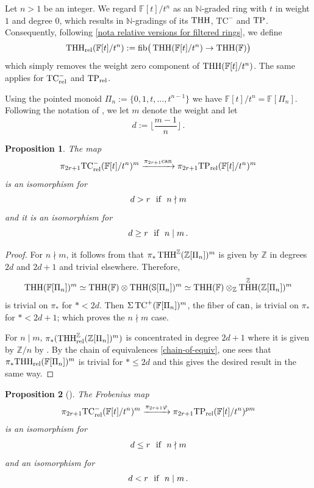 \documentclass[english,10pt]{amsart}
\newcommand{\sph}{\mathbb{S}}
\newcommand{\rel}{\textup{rel}}
\newcommand{\field}{\mathbb{F}}
\newtheorem{prop}{Proposition}[section]
\theoremstyle{definition}
\numberwithin{equation}{section}
\newcommand{\ntc}{\mathrm{TC}^{-}}
\DeclareMathOperator{\tp}{\ensuremath{\textup{TP}}}
\DeclareMathOperator{\tc}{\ensuremath{\textup{TC}}}
\DeclareMathOperator{\thh}{\ensuremath{\textup{THH}}}
\newcommand{\rntc}{\mathrm{TC}_{\rel}^{-}}
\newcommand{\rtp}{\mathrm{TP}_{\rel}}
\newcommand{\rthh}{\mathrm{THH}_{\rel}}
\newcommand{\z}{\mathbb{Z}}
\newcommand{\N}{\mathbb{N}}
\newcommand{\pis}{\pi_*}
\begin{document}
Let $n>1$ be an integer. We regard $\field[t]/t^n$ as an $\mathbb{N}$-graded ring with $t$ in weight $1$ and degree $0$, which results in  $\N$-gradings of its $\thh$, $\ntc$ and $\tp$. Consequently, following  \autoref{nota relative versions for filtered rings}, we define
\[\rthh(\field[t]/t^n):= \textup{fib} \big(\thh(\field[t]/t^n)\to \thh(\field)\big)\] 
which simply removes the weight zero component of $\thh(\field[t]/t^n)$. The same applies for $\rntc$ and $\rtp$. 

Using the pointed monoid $\Pi_n:= \{0,1,t,...,t^{n-1}\}$ we have $\field[t]/t^n  = \field[\Pi_n]$.  Following the notation of \cite{speirs2020truncatedpolynomial}, we let $m$ denote the weight and let 
\[d:= \Big\lfloor{\frac{m-1}{n}\Big\rfloor}\,. \]

\begin{prop}\label{prop speirs can iso}
The map 
\[\pi_{2r+1} \rntc(\field[t]/t^n)^m \xrightarrow{\pi_{2r+1} \textup{can}} \pi_{2r+1} \rtp(\field[t]/t^n)^m\]
is an isomorphism for 
\[d>r \textup{\ \ if \  } n \nmid m\]
and it is an isomorphism for 
\[d \geq r  \textup{\ \ if  \ } n \mid m\,.\]
\end{prop}
\begin{proof}
For $n\nmid m$, it follows from \cite[Lemma 4]{speirs2020truncatedpolynomial} that $\pis \thh^\z(\z[\Pi_n])^m$ is given by $\z$ in degrees $2d$ and $2d+1$ and trivial elsewhere. Therefore, 
\begin{equation}\label{chain-of-equiv}
\thh(\field[\Pi_n])^m \simeq \thh(\field) \otimes \thh(\sph[\Pi_n])^m \simeq \thh(
\field) \otimes_{\z}\thh^\z(\z[\Pi_n])^m
\end{equation}
is trivial on $\pis$ for $*<2d$. Then  $\Sigma \tc^+(\field[\Pi_n])^m$, the fiber of $\textup{can}$, is trivial on $\pis $ for $*<2d+1$; which proves the $n \nmid m$ case. 

For $n \mid m$, $\pi_*(\rthh^\z(\z[\Pi_n])^m)$ is concentrated in degree $2d+1$ where it is given by $\z/n$ by \cite[Lemma 4]{speirs2020truncatedpolynomial}. By the chain of equivalences \eqref{chain-of-equiv}, one sees that $\pis \rthh(\field[\Pi_n])^m$ is trivial for $*\leq 2d$ and this gives the desired result in the same way.
\end{proof}


\begin{prop}[{\cite[Corollary 9]{speirs2020truncatedpolynomial}}]\label{prop speirs frobenius iso}
The Frobenius map 
\[\pi_{2r+1} \rntc(\field[t]/t^n)^m \xrightarrow{\pi_{2r+1} \varphi} \pi_{2r+1} \rtp(\field[t]/t^n)^{pm}\]
is an isomorphism for 
\[d \leq r \textup{\ \ if  \ } n \nmid m\]
and an isomorphism for 
\[d < r \textup{\ \ if \  } n \mid m \,.\]
\end{prop}
\end{document}

